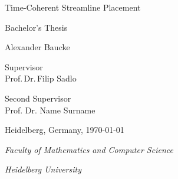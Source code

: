 
\begin{titlepage}
  \centering %
  \vspace*{\baselineskip} %


  {\huge Time-Coherent Streamline Placement}\\[0.2\baselineskip] %


  \vspace*{\baselineskip}

  {\Large Bachelor's Thesis\\[\baselineskip]} %
  \vspace*{\baselineskip}

  {\LARGE Alexander Baucke\\[\baselineskip]} %

  \vspace*{\baselineskip} %

  Supervisor\\
  {\large  Prof.\,Dr.\,Filip Sadlo\\[\baselineskip]} %

  Second Supervisor\\
  {\large  Prof. Dr. Name Surname\\[\baselineskip]} %

  \vfil

  Heidelberg, Germany,  \today \par %

  \vspace*{\baselineskip}

  {\itshape Faculty of Mathematics and Computer Science\par} %
  {\itshape Heidelberg University\par} %
\end{titlepage}

\cleardoublepage
